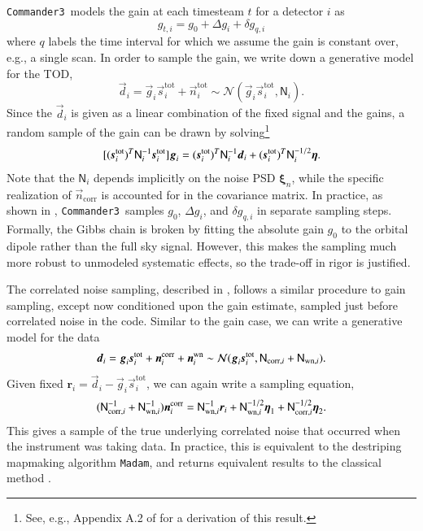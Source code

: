 \documentclass[twocolumn]{../../common/aa}
\def\commanderthree{\texttt{Commander3}}
\newcommand{\dv}[0]{\vec{d}}
\newcommand{\n}[0]{\vec{n}}
\newcommand{\s}[0]{\vec{s}}
\newcommand{\g}[0]{\vec{g}}
\newcommand{\N}[0]{\tens{N}}
\newcommand{\ncorr}{\vec n_\mathrm{corr}}
\begin{document}
\commanderthree\ models the gain at each timesteam $t$ for a detector $i$ as
\begin{equation}
	g_{t,i}=g_0+\Delta g_i+\delta g_{q,i}
\end{equation}
where $q$ labels the time interval for which we assume the gain is constant over, e.g., a single scan. In order to sample the gain, we write down a generative model for the TOD,
\begin{equation}
	\dv_i=\g_{i}\s_{i}^\mathrm{tot} +\n_{i}^\mathrm{tot}\sim\mathcal N(\g_i\s_{i}^\mathrm{tot},\mathsf N_i).
\end{equation}
Since the $\dv_i$ is given as a linear combination of the fixed signal and the gains, a random sample of the gain can be drawn by solving\footnote{See, e.g., Appendix A.2 of \citet{bp01} for a derivation of this result.}
\begin{equation}
	\label{eq:gain_gauss_samp}
	[(\s_i^\mathrm{tot})^T\mathsf N_i^{-1}\s_i^\mathrm{tot}]\g_i
	=(\s_i^\mathrm{tot})^T\N^{-1}_i\dv_i
	+(\s_i^\mathrm{tot})^T\N^{-1/2}_i\boldsymbol\eta.
\end{equation}
Note that the $\mathsf N_i$ depends implicitly on the noise PSD $\boldsymbol \xi_n$, while the specific realization of $\ncorr$ is accounted for in the covariance matrix.
In practice, as shown in \citet{bp07}, \commanderthree\ samples $g_0$, $\Delta g_i$, and $\delta g_{q,i}$ in separate sampling steps. Formally, the Gibbs chain is broken by fitting the absolute gain $g_0$ to the orbital dipole rather than the full sky signal. However, this makes the sampling much more robust to unmodeled systematic effects, so the trade-off in rigor is justified.

The correlated noise sampling, described in \citet{bp06}, follows a similar procedure to gain sampling, except now conditioned upon the gain estimate, sampled just before correlated noise in the code. Similar to the gain case, we can write a generative model for the data
\begin{equation}
	\dv_i=\g_i\s_i^\mathrm{tot}+\n_i^\mathrm{corr}+\n^\mathrm{wn}_i
	\sim\mathcal N(\g_i\s_i^\mathrm{tot},\N_{\mathrm{corr},i}+\N_{\mathrm{wn},i}).
\end{equation}
Given fixed $\boldsymbol r_i=\dv_i-\g_i\s_i^\mathrm{tot}$, we can again write a sampling equation, 
\begin{equation}
	\label{eq:ncorr_gauss_samp}
	(\N_{\mathrm{corr},i}^{-1}+\N_{\mathrm{wn},i}^{-1})
	\n^\mathrm{corr}_i
	=\N^{-1}_{\mathrm{wn},i}\boldsymbol r_i
	+\N^{-1/2}_{\mathrm{wn},i}\boldsymbol\eta_1
	+\N^{-1/2}_{\mathrm{corr},i}\boldsymbol\eta_2.
\end{equation}
This gives a sample of the true underlying correlated noise that occurred when the instrument was taking data. In practice, this is equivalent to the destriping mapmaking algorithm \texttt{Madam}, and returns equivalent results to the classical method \citep{bp02}.
\end{document}
